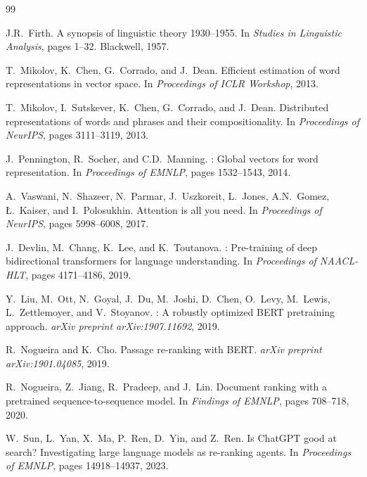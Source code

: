 \documentclass[11pt,a4paper]{article}
\theoremstyle{definition}
\theoremstyle{plain}
\begin{document}
\begin{thebibliography}{99}

J.R.~Firth.
\newblock A synopsis of linguistic theory 1930--1955.
\newblock In \emph{Studies in Linguistic Analysis}, pages 1--32. Blackwell, 1957.

T.~Mikolov, K.~Chen, G.~Corrado, and J.~Dean.
\newblock Efficient estimation of word representations in vector space.
\newblock In \emph{Proceedings of ICLR Workshop}, 2013.

T.~Mikolov, I.~Sutskever, K.~Chen, G.~Corrado, and J.~Dean.
\newblock Distributed representations of words and phrases and their compositionality.
\newblock In \emph{Proceedings of NeurIPS}, pages 3111--3119, 2013.

J.~Pennington, R.~Socher, and C.D.~Manning.
: Global vectors for word representation.
\newblock In \emph{Proceedings of EMNLP}, pages 1532--1543, 2014.

A.~Vaswani, N.~Shazeer, N.~Parmar, J.~Uszkoreit, L.~Jones, A.N.~Gomez, \L.~Kaiser, and I.~Polosukhin.
\newblock Attention is all you need.
\newblock In \emph{Proceedings of NeurIPS}, pages 5998--6008, 2017.

J.~Devlin, M.~Chang, K.~Lee, and K.~Toutanova.
: Pre-training of deep bidirectional transformers for language understanding.
\newblock In \emph{Proceedings of NAACL-HLT}, pages 4171--4186, 2019.

Y.~Liu, M.~Ott, N.~Goyal, J.~Du, M.~Joshi, D.~Chen, O.~Levy, M.~Lewis, L.~Zettlemoyer, and V.~Stoyanov.
: A robustly optimized {BERT} pretraining approach.
\newblock \emph{arXiv preprint arXiv:1907.11692}, 2019.

R.~Nogueira and K.~Cho.
\newblock Passage re-ranking with {BERT}.
\newblock \emph{arXiv preprint arXiv:1901.04085}, 2019.

R.~Nogueira, Z.~Jiang, R.~Pradeep, and J.~Lin.
\newblock Document ranking with a pretrained sequence-to-sequence model.
\newblock In \emph{Findings of EMNLP}, pages 708--718, 2020.

W.~Sun, L.~Yan, X.~Ma, P.~Ren, D.~Yin, and Z.~Ren.
\newblock Is {ChatGPT} good at search? {Investigating} large language models as re-ranking agents.
\newblock In \emph{Proceedings of EMNLP}, pages 14918--14937, 2023.


\end{thebibliography}
\end{document}
